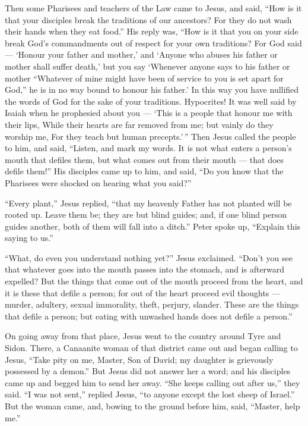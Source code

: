  Then some Pharisees and teachers of the Law came to Jesus,
and said,  ``How is it that your disciples break the
traditions of our ancestors? For they do not wash their hands when they
eat food.''  His reply was, ``How is it that you on your
side break God's commandments out of respect for your own traditions?
 For God said --- `Honour your father and mother,' and
`Anyone who abuses his father or mother shall suffer death,'
 but you say `Whenever anyone says to his father or mother
``Whatever of mine might have been of service to you is set apart for
God,''  he is in no way bound to honour his father.' In this
way you have nullified the words of God for the sake of your traditions.
 Hypocrites! It was well said by Isaiah when he prophesied
about you ---  `This is a people that honour me with their
lips, While their hearts are far removed from me;  but
vainly do they worship me, For they teach but human precepts.'\,''
 Then Jesus called the people to him, and said, ``Listen,
and mark my words.  It is not what enters a person's mouth
that defiles them, but what comes out from their mouth --- that does
defile them!''  His disciples came up to him, and said,
``Do you know that the Pharisees were shocked on hearing what you
said?''

 ``Every plant,'' Jesus replied, ``that my heavenly Father
has not planted will be rooted up.  Leave them be; they are
but blind guides; and, if one blind person guides another, both of them
will fall into a ditch.''  Peter spoke up, ``Explain this
saying to us.''

 ``What, do even you understand nothing yet?'' Jesus
exclaimed.  ``Don't you see that whatever goes into the
mouth passes into the stomach, and is afterward expelled? 
But the things that come out of the mouth proceed from the heart, and it
is these that defile a person;  for out of the heart
proceed evil thoughts --- murder, adultery, sexual immorality, theft,
perjury, slander.  These are the things that defile a
person; but eating with unwashed hands does not defile a person.''

 On going away from that place, Jesus went to the country
around Tyre and Sidon.  There, a Canaanite woman of that
district came out and began calling to Jesus, ``Take pity on me, Master,
Son of David; my daughter is grievously possessed by a demon.''
 But Jesus did not answer her a word; and his disciples
came up and begged him to send her away. ``She keeps calling out after
us,'' they said.  ``I was not sent,'' replied Jesus, ``to
anyone except the lost sheep of Israel.''  But the woman
came, and, bowing to the ground before him, said, ``Master, help me.''

